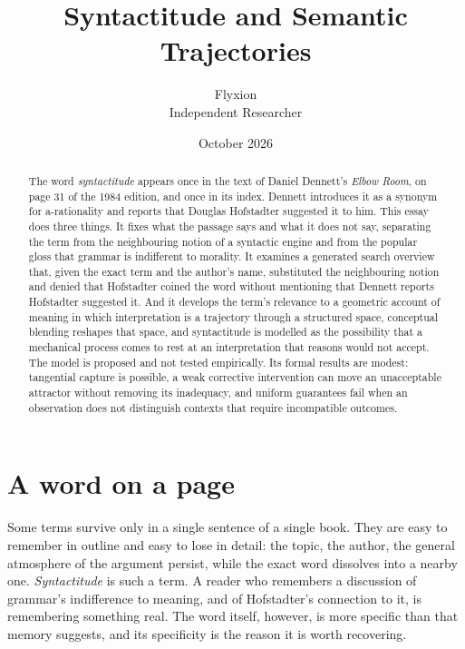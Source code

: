\documentclass[11pt]{article}
\title{Syntactitude and Semantic Trajectories}
\author{Flyxion\\\small Independent Researcher}
\date{October 2026}
\begin{document}
\maketitle

\begin{abstract}
\noindent
The word \emph{syntactitude} appears once in the text of Daniel Dennett's \emph{Elbow Room}, on page 31 of the 1984 edition, and once in its index. Dennett introduces it as a synonym for a-rationality and reports that Douglas Hofstadter suggested it to him. This essay does three things. It fixes what the passage says and what it does not say, separating the term from the neighbouring notion of a syntactic engine and from the popular gloss that grammar is indifferent to morality. It examines a generated search overview that, given the exact term and the author's name, substituted the neighbouring notion and denied that Hofstadter coined the word without mentioning that Dennett reports Hofstadter suggested it. And it develops the term's relevance to a geometric account of meaning in which interpretation is a trajectory through a structured space, conceptual blending reshapes that space, and syntactitude is modelled as the possibility that a mechanical process comes to rest at an interpretation that reasons would not accept. The model is proposed and not tested empirically. Its formal results are modest: tangential capture is possible, a weak corrective intervention can move an unacceptable attractor without removing its inadequacy, and uniform guarantees fail when an observation does not distinguish contexts that require incompatible outcomes.
\end{abstract}

\section{A word on a page}

Some terms survive only in a single sentence of a single book. They are easy to remember in outline and easy to lose in detail: the topic, the author, the general atmosphere of the argument persist, while the exact word dissolves into a nearby one. \emph{Syntactitude} is such a term. A reader who remembers a discussion of grammar's indifference to meaning, and of Hofstadter's connection to it, is remembering something real. The word itself, however, is more specific than that memory suggests, and its specificity is the reason it is worth recovering.
\end{document}
